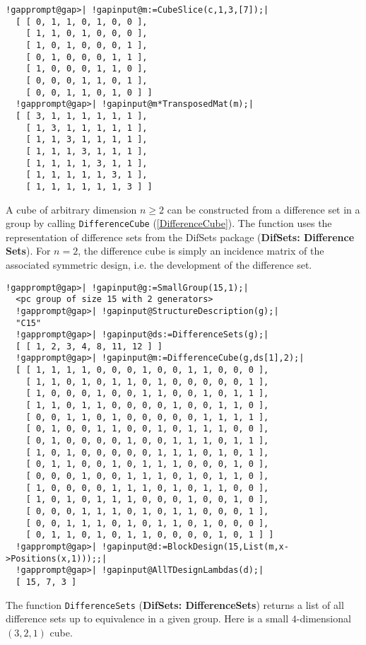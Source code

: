 \documentclass[a4paper,11pt]{report}
\begin{document}
{{\begin{Verbatim}[commandchars=!@|,fontsize=\small,frame=single,label=Example]
  !gapprompt@gap>| !gapinput@m:=CubeSlice(c,1,3,[7]);|
  [ [ 0, 1, 1, 0, 1, 0, 0 ], 
    [ 1, 1, 0, 1, 0, 0, 0 ], 
    [ 1, 0, 1, 0, 0, 0, 1 ], 
    [ 0, 1, 0, 0, 0, 1, 1 ], 
    [ 1, 0, 0, 0, 1, 1, 0 ], 
    [ 0, 0, 0, 1, 1, 0, 1 ], 
    [ 0, 0, 1, 1, 0, 1, 0 ] ]
  !gapprompt@gap>| !gapinput@m*TransposedMat(m);|
  [ [ 3, 1, 1, 1, 1, 1, 1 ], 
    [ 1, 3, 1, 1, 1, 1, 1 ], 
    [ 1, 1, 3, 1, 1, 1, 1 ], 
    [ 1, 1, 1, 3, 1, 1, 1 ], 
    [ 1, 1, 1, 1, 3, 1, 1 ], 
    [ 1, 1, 1, 1, 1, 3, 1 ], 
    [ 1, 1, 1, 1, 1, 1, 3 ] ]
\end{Verbatim}
 A cube of arbitrary dimension $n\ge 2$ can be constructed from a difference set in a group by calling \texttt{DifferenceCube} (\ref{DifferenceCube}). The function uses the representation of difference sets from the \textsf{DifSets} package  (\textbf{DifSets: Difference Sets}). For $n=2$, the difference cube is simply an incidence matrix of the associated
symmetric design, i.e. the development of the difference set. 
\begin{Verbatim}[commandchars=!@|,fontsize=\small,frame=single,label=Example]
  !gapprompt@gap>| !gapinput@g:=SmallGroup(15,1);|
  <pc group of size 15 with 2 generators>
  !gapprompt@gap>| !gapinput@StructureDescription(g);|
  "C15"
  !gapprompt@gap>| !gapinput@ds:=DifferenceSets(g);|
  [ [ 1, 2, 3, 4, 8, 11, 12 ] ]
  !gapprompt@gap>| !gapinput@m:=DifferenceCube(g,ds[1],2);|
  [ [ 1, 1, 1, 1, 0, 0, 0, 1, 0, 0, 1, 1, 0, 0, 0 ], 
    [ 1, 1, 0, 1, 0, 1, 1, 0, 1, 0, 0, 0, 0, 0, 1 ], 
    [ 1, 0, 0, 0, 1, 0, 0, 1, 1, 0, 0, 1, 0, 1, 1 ], 
    [ 1, 1, 0, 1, 1, 0, 0, 0, 0, 1, 0, 0, 1, 1, 0 ], 
    [ 0, 0, 1, 1, 0, 1, 0, 0, 0, 0, 0, 1, 1, 1, 1 ], 
    [ 0, 1, 0, 0, 1, 1, 0, 0, 1, 0, 1, 1, 1, 0, 0 ], 
    [ 0, 1, 0, 0, 0, 0, 1, 0, 0, 1, 1, 1, 0, 1, 1 ], 
    [ 1, 0, 1, 0, 0, 0, 0, 0, 1, 1, 1, 0, 1, 0, 1 ], 
    [ 0, 1, 1, 0, 0, 1, 0, 1, 1, 1, 0, 0, 0, 1, 0 ], 
    [ 0, 0, 0, 1, 0, 0, 1, 1, 1, 0, 1, 0, 1, 1, 0 ], 
    [ 1, 0, 0, 0, 0, 1, 1, 1, 0, 1, 0, 1, 1, 0, 0 ], 
    [ 1, 0, 1, 0, 1, 1, 1, 0, 0, 0, 1, 0, 0, 1, 0 ], 
    [ 0, 0, 0, 1, 1, 1, 0, 1, 0, 1, 1, 0, 0, 0, 1 ], 
    [ 0, 0, 1, 1, 1, 0, 1, 0, 1, 1, 0, 1, 0, 0, 0 ], 
    [ 0, 1, 1, 0, 1, 0, 1, 1, 0, 0, 0, 0, 1, 0, 1 ] ]
  !gapprompt@gap>| !gapinput@d:=BlockDesign(15,List(m,x->Positions(x,1)));;|
  !gapprompt@gap>| !gapinput@AllTDesignLambdas(d);|
  [ 15, 7, 3 ]
\end{Verbatim}
 The function \texttt{DifferenceSets} (\textbf{DifSets: DifferenceSets}) returns a list of all difference sets up to equivalence in a given group. Here
is a small $4$-dimensional $(3,2,1)$ cube. 
}}
\end{document}
